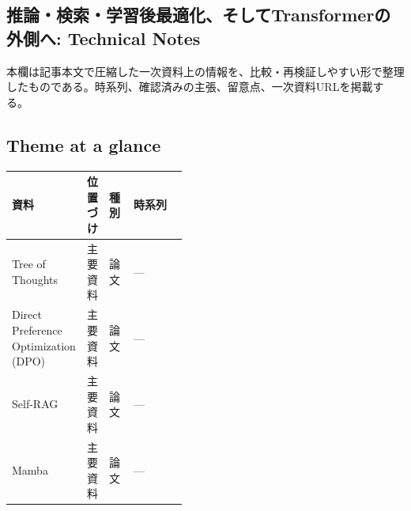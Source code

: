 \subsection*{推論・検索・学習後最適化、そしてTransformerの外側へ: Technical Notes}
本欄は記事本文で圧縮した一次資料上の情報を、比較・再検証しやすい形で整理したものである。時系列、確認済みの主張、留意点、一次資料URLを掲載する。
\medskip
\subsection*{Theme at a glance}
\begin{center}
\footnotesize
\begin{tabularx}{\linewidth}{@{}p{0.20\linewidth}p{0.10\linewidth}p{0.14\linewidth}X@{}}
\toprule
資料 & 位置づけ & 種別 & 時系列 \\
\midrule
Tree of Thoughts & 主要資料 & 論文 & — \\
Direct Preference Optimization (DPO) & 主要資料 & 論文 & — \\
Self-RAG & 主要資料 & 論文 & — \\
Mamba & 主要資料 & 論文 & — \\
\bottomrule
\end{tabularx}
\end{center}
\normalsize

